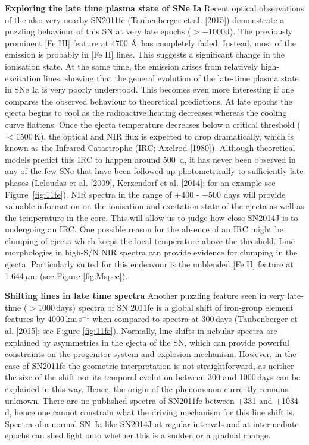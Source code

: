 \documentclass[11pt]{article}
\begin{document}
\textbf{Exploring the late time plasma state of SNe Ia} Recent optical observations of the also very nearby SN2011fe (Taubenberger et al. [2015]) demonstrate a puzzling behaviour of this SN at very late epochs ($>$+1000d). The previously prominent [Fe III] feature at 4700 \AA\ has completely faded. Instead, most of the emission is probably in [Fe II] lines. This suggests a significant change in the ionisation state. At the same time, the emission arises from relatively high-excitation lines, showing that the general evolution of the late-time plasma state in SNe Ia is very poorly understood. This becomes even more interesting if one compares the observed behaviour to theoretical predictions. At late epochs the ejecta begins to cool as the radioactive heating decreases whereas the cooling curve flattens. Once the ejecta temperature decreases below a critical threshold ($< 1500$\,K), the optical and NIR flux is expected to drop dramatically, which is known as the Infrared Catastrophe (IRC; Axelrod [1980]). Although theoretical models predict this IRC to happen around 500 \,d, it has never been observed in any of the few SNe that have been followed up photometrically to sufficiently late phases (Leloudas et al. [2009], Kerzendorf et al. [2014]; for an example see Figure~\ref{fig:11fe}). NIR spectra in the range of +400 - +500 days will provide valuable information on the ionisation and excitation state of the ejecta as well as the temperature in the core. This will allow us to judge how close SN2014J is to undergoing an IRC. One possible reason for the absence of an IRC might be clumping of ejecta which keeps the local temperature above the threshold. Line morphologies in high-S/N NIR spectra can provide evidence for clumping in the ejecta.  Particularly suited for this endeavour is the unblended [Fe II] feature at 1.644\,$\mu$m (see Figure \ref{fig:Mspec}).  




\textbf{Shifting lines in late time spectra}
Another puzzling feature seen in very late-time ($>1000$\,days) spectra of SN 2011fe is a global shift of iron-group element features by 4000\,km\,s$^{-1}$ when compared to spectra at 300\,days (Taubenberger et al. [2015]; see Figure \ref{fig:11fe}). Normally, line shifts in nebular spectra are explained by asymmetries in the ejecta of the SN, which can provide powerful constraints on the progenitor system and explosion mechanism. However, in the case of SN2011fe the geometric interpretation is not straightforward, as neither the size of the  shift nor its temporal evolution between 300 and 1000\,days can be explained in this way. Hence, the origin of the phenomenon currently remains unknown. There are no published spectra of SN2011fe between +331 and +1034\,d, hence one cannot constrain what the driving mechanism for this line shift is. Spectra of a normal SN~Ia like SN2014J at regular intervals and at intermediate epochs can shed light onto whether this is a sudden or a gradual change. 
\end{document}
